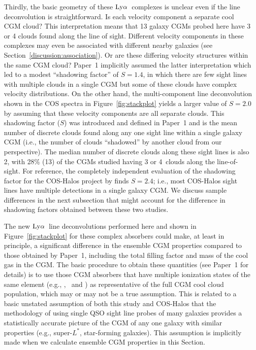 \documentclass[twocolumn,twocolappendix,tighten,times]{aastex6}
\newcommand{\SiII}{\ion{Si}{2}}
\newcommand{\SiIII}{\ion{Si}{3}}
\newcommand{\SiIV}{\ion{Si}{4}}
\newcommand{\lya}{\ensuremath{{\rm Ly}\alpha}}
\begin{document}
Thirdly, the basic geometry of these \lya\ complexes is unclear even if the 
line deconvolution is straightforward. Is each velocity component a separate 
cool CGM cloud? This interpretation means that 13 galaxy CGMs probed here have 
3 or 4 clouds found along the line of sight. Different velocity components in 
these complexes may even be associated with different nearby galaxies (see 
Section~\ref{discussion:association}). Or are these differing velocity 
structures within the same CGM cloud? Paper~1 implicitly assumed the latter 
interpretation which led to a modest ``shadowing factor'' of $S=1.4$, in which 
there are few sight lines with multiple clouds in a single CGM but some of these 
clouds have complex velocity distributions. On the other hand, the multi-component 
line deconvolution shown in the COS spectra in Figure~\ref{fig:stackplot} yields a 
larger value of $S=2.0$ by assuming that these velocity components are all 
separate clouds. This shadowing factor ($S$) was introduced and defined in Paper~1 
and is the mean number of discrete clouds found along any one sight line within a 
single galaxy CGM (i.e., the number of clouds ``shadowed'' by another cloud from 
our perspective). The median number of discrete clouds along these sight lines is 
also 2, with 28\% (13) of the CGMs studied having 3 or 4~clouds along the line-of-
sight. For reference, the completely independent evaluation of the shadowing 
factor for the COS-Halos project by \citet{werk14} finds $S=2.4$; i.e., most 
COS-Halos sight lines have multiple detections in a single galaxy CGM. We discuss 
sample differences in the next subsection that might account for the difference 
in shadowing factors obtained between these two studies.

The new \lya\ line deconvolutions performed here and shown in 
Figure~\ref{fig:stackplot} for these complex absorbers could make, at least in
principle, a significant difference in the ensemble CGM properties compared to 
those obtained by Paper~1, including the total filling factor and mass of the cool 
gas in the CGM. The basic procedure to obtain these quantities (see Paper~1 for 
details) is to use those CGM absorbers that have multiple ionization states of the 
same element (e.g., \SiII, \SiIII\ and \SiIV) as representative of the full CGM 
cool cloud population, which may or may not be a true assumption. This is related 
to a basic unstated assumption of both this study and COS-Halos that the 
methodology of using single QSO sight line probes of many galaxies provides a 
statistically accurate picture of the CGM of any one galaxy with similar 
properties (e.g., super-$L^*$, star-forming galaxies). This assumption is 
implicitly made when we calculate ensemble CGM properties in this Section.  
\end{document}
